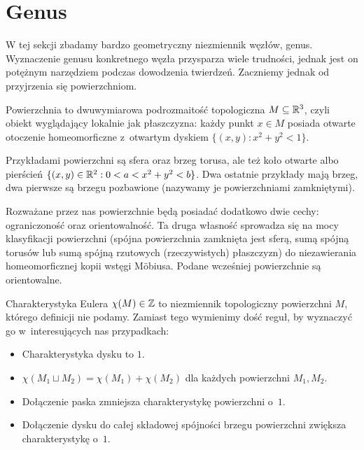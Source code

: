 \section{Genus} %
\label{sec:genus}
W tej sekcji zbadamy bardzo geometryczny niezmiennik węzłów, genus.
Wyznaczenie genusu konkretnego węzła przysparza wiele trudności, jednak jest on potężnym narzędziem podczas dowodzenia twierdzeń.
Zaczniemy jednak od przyjrzenia się powierzchniom.

\begin{definition}
    Powierzchnia to dwuwymiarowa podrozmaitość topologiczna $M \subseteq \mathbb R^3$, czyli obiekt wyglądający lokalnie jak płaszczyzna: każdy punkt $x \in M$ posiada otwarte otoczenie homeomorficzne z~otwartym dyskiem $\{(x,y) : x^2 + y^2 < 1\}$.
\end{definition}

Przykładami powierzchni są sfera oraz brzeg torusa, ale też koło otwarte albo pierścień $\{(x, y) \in \mathbb R^2 : 0 < a < x^2 + y^2 < b\}$.
Dwa ostatnie przykłady mają brzeg, dwa pierwsze są brzegu pozbawione (nazywamy je powierzchniami zamkniętymi).

Rozważane przez nas powierzchnie będą posiadać dodatkowo dwie cechy: ograniczoność oraz orientowalność.
Ta druga własność sprowadza się na mocy klasyfikacji powierzchni (spójna powierzchnia zamknięta jest sferą, sumą spójną torusów lub sumą spójną rzutowych (rzeczywistych) płaszczyzn) do niezawierania homeomorficznej kopii wstęgi Möbiusa.
Podane wcześniej powierzchnie są orientowalne.

\begin{definition}
    Charakterystyka Eulera $\chi(M) \in \mathbb Z$ to niezmiennik
    topologiczny powierzchni $M$, którego definicji nie podamy.
    Zamiast tego wymienimy dość reguł,
    by wyznaczyć go w~interesujących nas przypadkach:
    \begin{itemize}
        \item Charakterystyka dysku to $1$.
        \item $\chi(M_1 \sqcup M_2)=\chi(M_1) + \chi(M_2)$ dla każdych powierzchni $M_1, M_2$.
        \item Dołączenie paska zmniejsza charakterystykę powierzchni o~$1$.
        \item Dołączenie dysku do całej składowej spójności brzegu powierzchni zwiększa charakterystykę o~$1$.
    \end{itemize}
\end{definition}


